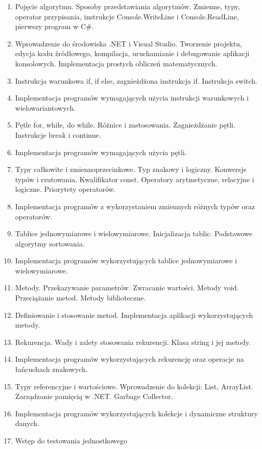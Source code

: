\documentclass[12pt, a4paper]{article}
\begin{document}
\begin{enumerate}
  \item Pojęcie algorytmu. Sposoby przedstawiania algorytmów. Zmienne, typy, operator przypisania, instrukcje Console.WriteLine i Console.ReadLine, pierwszy program w C\#.
  \item Wprowadzenie do środowiska .NET i Visual Studio. Tworzenie projektu, edycja kodu źródłowego, kompilacja, uruchamianie i debugowanie aplikacji konsolowych. Implementacja prostych obliczeń matematycznych.
  \item Instrukcja warunkowa if, if else, zagnieżdżona instrukcja if. Instrukcja switch.
  \item Implementacja programów wymagających użycia instrukcji warunkowych i wielowariantowych.
  \item Pętle for, while, do while. Różnice i zastosowania. Zagnieżdżanie pętli. Instrukcje break i continue.
  \item Implementacja programów wymagających użycia pętli.
  \item Typy całkowite i zmiennoprzecinkowe. Typ znakowy i logiczny. Konwersje typów i rzutowania. Kwalifikator const. Operatory arytmetyczne, relacyjne i logiczne. Priorytety operatorów.
  \item Implementacja programów z wykorzystaniem zmiennych różnych typów oraz operatorów.
  \item Tablice jednowymiarowe i wielowymiarowe. Inicjalizacja tablic. Podstawowe algorytmy sortowania.
  \item Implementacja programów wykorzystujących tablice jednowymiarowe i wielowymiarowe.
  \item Metody. Przekazywanie parametrów. Zwracanie wartości. Metody void. Przeciążanie metod. Metody biblioteczne.
  \item Definiowanie i stosowanie metod. Implementacja aplikacji wykorzystujących metody.
  \item Rekurencja. Wady i zalety stosowania rekurencji. Klasa string i jej metody.
  \item Implementacja programów wykorzystujących rekurencję oraz operacje na łańcuchach znakowych.
  \item Typy referencyjne i wartościowe. Wprowadzenie do kolekcji: List, ArrayList. Zarządzanie pamięcią w .NET. Garbage Collector.
  \item Implementacja programów wykorzystujących kolekcje i dynamiczne struktury danych.
  \item Wstęp do testowania jednostkowego
\end{enumerate}
\end{document}

